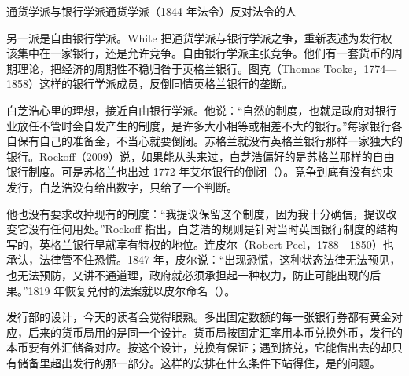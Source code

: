 \begin{compare}{通货学派与银行学派}{通货学派（1844 年法令）}{反对法令的人}
\end{compare}

另一派是自由银行学派。White 把通货学派与银行学派之争，重新表述为发行权该集中在一家银行，还是允许竞争\cite{bordo1984}。自由银行学派主张竞争。他们有一套货币的周期理论，把经济的周期性不稳归咎于英格兰银行\cite{bordo1984}。图克（Thomas Tooke，1774—1858）这样的银行学派成员，反倒同情英格兰银行的垄断\cite{bordo1984}。

白芝浩心里的理想，接近自由银行学派。他说：“自然的制度，也就是政府对银行业放任不管时会自发产生的制度，是许多大小相等或相差不大的银行。”\cite{bagehot1873}每家银行各自保有自己的准备金，不当心就要倒闭\cite{bagehot1873}。苏格兰就没有英格兰银行那样一家独大的银行\cite{bagehot1873}。Rockoff（2009）说，如果能从头来过，白芝浩偏好的是苏格兰那样的自由银行制度\cite{rockoff2009}。可是苏格兰也出过 1772 年艾尔银行的倒闭（）。竞争到底有没有约束发行，白芝浩没有给出数字，只给了一个判断。

他也没有要求改掉现有的制度：“我提议保留这个制度，因为我十分确信，提议改变它没有任何用处。”\cite{bagehot1873}Rockoff 指出，白芝浩的规则是针对当时英国银行制度的结构写的，英格兰银行早就享有特权的地位\cite{rockoff2009}。连皮尔（Robert Peel，1788—1850）也承认，法律管不住恐慌。1847 年，皮尔说：“出现恐慌，这种状态法律无法预见，也无法预防，又讲不通道理，政府就必须承担起一种权力，防止可能出现的后果。”\cite{dornbusch1984}1819 年恢复兑付的法案就以皮尔命名（）。

发行部的设计，今天的读者会觉得眼熟。多出固定数额的每一张银行券都有黄金对应，后来的货币局用的是同一个设计。货币局按固定汇率用本币兑换外币，发行的本币要有外汇储备对应。按这个设计，兑换有保证；遇到挤兑，它能借出去的却只有储备里超出发行的那一部分。这样的安排在什么条件下站得住，是的问题。

